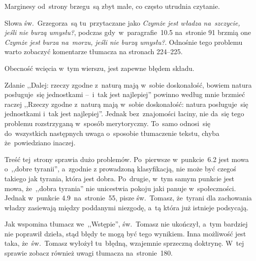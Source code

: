 \documentclass[a4paper,11pt]{article}
\begin{document}



\start Marginesy od~strony brzegu~są zbyt małe, co często utrudnia
czytanie.

\vspace{\spaceFour}


\start {} Słowa św.~Grzegorza~są tu~przytaczane jako
\emph{Czymże jest władza na~szczycie, jeśli nie burzą umysłu?},
podczas gdy~w~paragrafie~10.5 na~stronie 91 brzmią one \emph{Czymże
  jest burza na~morzu, jeśli nie burzą umysłu?}. Odnośnie tego
problemu warto zobaczyć komentarze tłumacza na stronach 224--225.

\vspace{\spaceFour}


\start {} Obecność wcięcia w~tym wierszu, jest zapewne
błędem składu.

\vspace{\spaceFour}


\start {} Zdanie ,,Dalej: rzeczy zgodne z~naturą mają
w~sobie doskonałość, bowiem natura posługuje~się jednostkami --~i~tak
jest najlepiej'' powinno według mnie brzmieć raczej ,,Rzeczy zgodne
z~naturą mają w~sobie doskonałość: natura posługuje~się jednostkami
i~tak jest najlepiej''. Jednak bez~znajomości łaciny, nie da~się tego
problemu rozstrzyganą w~sposób merytoryczny. To~samo odnosi~się
do~wszystkich następnych uwaga o~sposobie tłumaczenie tekstu, chyba
że~powiedziano inaczej.

\vspace{\spaceFour}


\start {} Treść tej~strony sprawia dużo problemów. Po~pierwsze
w~punkcie~6.2 jest mowa o~,,dobre tyranii'', a~zgodnie z prowadzoną
klasyfikacją, nie może być czegoś takiego jak tyrania, która jest
dobra. Po~drugie, w~tym samym punkcie jest mowa, że~,,dobra tyrania''
nie unicestwia pokoju jaki panuje w~społeczności. Jednak w~punkcie
4.9~na~stronie~55, pisze św.~Tomasz, że~tyrani dla zachowania władzy
zasiewają między poddanymi niezgodę, a~tą która już istnieje
podsycają.

Jak wspomina tłumacz we~,,Wstępie'', św.~Tomasz nie ukończył, a~tym
bardziej nie poprawił dzieła, stąd błędy te mogą być tego wynikiem.
Inna możliwość jest taka, że~św.~Tomasz wyłożył tu~błędną, wzajemnie
sprzeczną doktrynę. W~tej sprawie zobacz również uwagi tłumacza
na~stronie~180.
\end{document}
